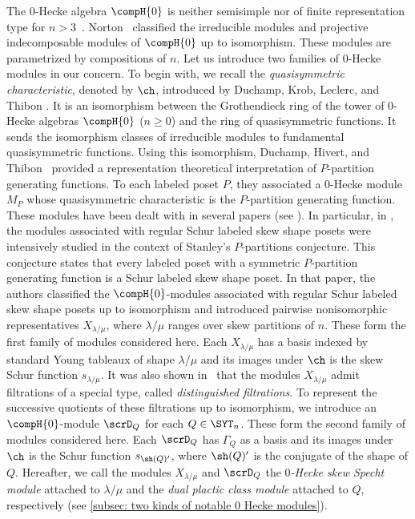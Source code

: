\documentclass[12pt, reqno]{amsart}
\theoremstyle{plain}
\theoremstyle{definition}
\numberwithin{equation}{section}
\numberwithin{figure}{section}
\numberwithin{table}{section}
\begin{document}
The $0$-Hecke algebra $\compH{0}$ is neither semisimple nor of finite representation type for $n>3$~\cite{11DY,02DHT}. 
Norton~\cite{79Norton} classified the irreducible modules and projective indecomposable modules of $\compH{0}$ up to isomorphism.
These modules are parametrized by compositions  of $n$. 
Let us introduce two families of $0$-Hecke modules in our concern.
To begin with, we recall the \emph{quasisymmetric characteristic}, denoted by $\ch$, introduced by Duchamp, Krob, Leclerc, and Thibon \cite{96DKLT}.
It is an isomorphism between the Grothendieck ring of the tower of $0$-Hecke algebras $\compH{0}$ ($n \geq 0$) and the ring of quasisymmetric functions.
It sends the isomorphism classes of irreducible modules to fundamental quasisymmetric functions.
Using this isomorphism, Duchamp, Hivert, and Thibon~\cite{02DHT} provided a representation theoretical interpretation of $P$-partition generating functions.
To each labeled poset $P$, they associated a $0$-Hecke module $M_P$ whose quasisymmetric characteristic is the $P$-partition generating function.
These modules have been dealt with in several papers (see \cite{03McNamara, 23CKO, 23KLO, 25Searles, 26KS}).
In particular, in \cite{23KLO}, the modules associated with regular Schur labeled skew shape posets were intensively studied in the context of Stanley's $P$-partitions conjecture.
This conjecture states that every labeled poset with a symmetric $P$-partition generating function is a Schur labeled skew shape poset.
In that paper, the authors classified the $\compH{0}$-modules associated with regular Schur labeled skew shape posets up to isomorphism and introduced pairwise nonisomorphic representatives $X_{\lambda/\mu}$, where $\lambda/\mu$ ranges over skew partitions of $n$.
These form the first family of modules considered here.
Each $X_{\lambda/\mu}$ has a basis indexed by standard Young tableaux of shape $\lambda/\mu$ and its images under $\ch$  is the skew Schur function $s_{\lambda/\mu}$.
It was also shown in~\cite{23KLO} that the modules $X_{\lambda/\mu}$ admit filtrations of a special type, called \emph{distinguished filtrations}.
To represent the successive quotients of these filtrations up to isomorphism, we introduce an $\compH{0}$-module $\scrD_Q$ for each $Q \in \SYT_n$.
These form the second family of modules considered here.
Each $\scrD_Q$ has $\Gamma_Q$ as a basis and
its images under $\ch$ is the Schur function $s_{\sh(Q)'}$, where $\sh(Q)'$ is the conjugate of the shape of $Q$.
 Hereafter, we call the modules $X_{\lambda/\mu}$ and $\scrD_Q$ the \emph{$0$-Hecke skew Specht module} attached to $\lambda/\mu$ and the \emph{dual plactic class module} attached to $Q$, respectively (see \cref{subsec: two kinds of notable 0 Hecke modules}). 
\end{document}
